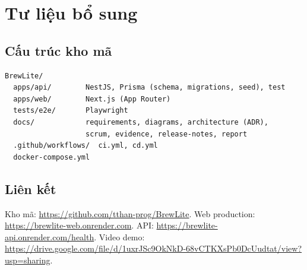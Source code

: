 \chapter{Tư liệu bổ sung}\label{app:khac}
\section{Cấu trúc kho mã}\label{app:khac1}
\begin{lstlisting}[caption={Cấu trúc thư mục chính của repository},label={lst:tree}]
BrewLite/
  apps/api/        NestJS, Prisma (schema, migrations, seed), test
  apps/web/        Next.js (App Router)
  tests/e2e/       Playwright
  docs/            requirements, diagrams, architecture (ADR),
                   scrum, evidence, release-notes, report
  .github/workflows/  ci.yml, cd.yml
  docker-compose.yml
\end{lstlisting}

\section{Liên kết}\label{app:khac2}
Kho mã: \url{https://github.com/tthan-prog/BrewLite}. Web production: \url{https://brewlite-web.onrender.com}. API: \url{https://brewlite-api.onrender.com/health}. Video demo: \url{https://drive.google.com/file/d/1uxrJSc9OkNkD-68vCTKXsPb0DcUudtat/view?usp=sharing}.
